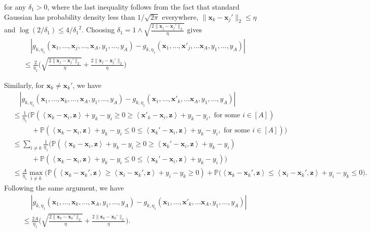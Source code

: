 \documentclass[10pt]{article}
\newcommand{\<}{\left\langle}
\renewcommand{\>}{\right\rangle}
\renewcommand{\P}{\mathbb{P}}
\newcommand{\trunprob}{{\eta_1}}
\newcommand{\Trunregp}{{\eta}}
\def\bx{{\mathbf x}}
\def\bz{{\mathbf z}}
\begin{document}
for any ${\delta_1}>0$,
where the last inequality follows from the fact that standard Gaussian has probability density less than $1/\sqrt{2\pi}$ everywhere,  $\|\bx_k-\bx_j'\|_2\leq \Trunregp$ and $\log(2/{\delta_1})\leq 4/{\delta_1}^2$. Choosing ${\delta_1}=1\wedge\sqrt{\frac{2\|\bx_j-\bx_j'\|_2}{\Trunregp}}$ gives
\begin{align*}
 &\quad |g_{k,\trunprob}(\bx_1,\ldots,\bx_j,\ldots,\bx_A,y_1,\ldots,y_A)-g_{k,\trunprob}(\bx_1,\ldots,\bx'_j,\ldots\bx_A,y_1,\ldots,y_A)|\\
 &\leq
  \frac{2}{\trunprob}\Big(\sqrt{\frac{2\|\bx_j-\bx_j'\|_2}{\Trunregp}}+\frac{2\|\bx_j-\bx_j'\|_2}{\Trunregp}\Big)
\end{align*}

Similarly, for $\bx_k\neq\bx_k'$, we have
\begin{align*}
     &\quad|g_{k,\trunprob}(\bx_1,\ldots,\bx_k,\ldots,\bx_A,y_1,\ldots,y_A)-g_{k,\trunprob}(\bx_1,\ldots,\bx'_k,\ldots\bx_A,y_1,\ldots,y_A)|
        \\
     &\leq
     \frac{1}{\trunprob}\Big(\P(\<\bx_k-\bx_i,\bz\>+y_k-y_i\geq0\geq \<\bx'_k-\bx_i,\bz\>+y_k-y_i,\text{~for some~}i\in[A])\\&\qquad~~~+\P(\<\bx_k-\bx_i,\bz\>+y_k-y_i\leq0\leq \<\bx_k'-\bx_i,\bz\>+y_k-y_i,\text{~for some~}i\in[A])\Big)
     \\
       &\leq
    \sum_{i\neq k} \frac{1}{\trunprob}\Big(\P(\<\bx_k-\bx_i,\bz\>+y_k-y_i\geq0\geq \<\bx_k'-\bx_i,\bz\>+y_k-y_i)\\&\qquad~~~+\P(\<\bx_k-\bx_i,\bz\>+y_k-y_i\leq0\leq \<\bx_k'-\bx_i,\bz\>+y_k-y_i)\Big)\\
    &\leq \frac{A}{\trunprob}\max_{i
    \neq k}\Big(\P(\<\bx_k-\bx_k',\bz\>\geq\<\bx_i-\bx_k',\bz\>+y_i-y_k\geq0 )+\P(\<\bx_k-\bx_k',\bz\>\leq \<\bx_i-\bx_k',\bz\>+y_i-y_k\leq0\Big).
\end{align*}
Following the same argument, we have
\begin{align*}
&\quad~|g_{k,\trunprob}(\bx_1,\ldots,\bx_k,\ldots,\bx_A,y_1,\ldots,y_A)-g_{k,\trunprob}(\bx_1,\ldots,\bx'_k,\ldots\bx_A,y_1,\ldots,y_A)|\\&\leq   \frac{2A}{\trunprob}\Big(\sqrt{\frac{2\|\bx_k-\bx_k'\|_2}{\Trunregp}}+\frac{2\|\bx_k-\bx_k'\|_2}{\Trunregp}\Big).
\end{align*}
\end{document}
